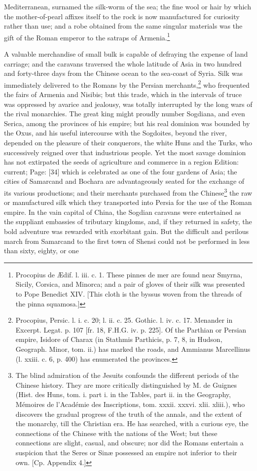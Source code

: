 Mediterranean, surnamed the silk-worm of the sea; the fine wool or hair by which the mother-of-pearl affixes itself to the rock is now manufactured for curiosity rather than use; and a robe obtained from the same singular materials was the gift of the Roman emperor to the satraps of Armenia.\footnote{Procopius de Ædif. l. iii. c. 1. These pinnes de mer are found near Smyrna, Sicily, Corsica, and Minorca; and a pair of gloves of their silk was presented to Pope Benedict XIV. [This cloth is the byssus woven from the threads of the pinna squamosa.]}

A valuable merchandise of small bulk is capable of defraying the expense of land carriage; and the caravans traversed the whole latitude of Asia in two hundred and forty-three days from the Chinese ocean to the sea-coast of Syria. Silk was immediately delivered to the Romans by the Persian merchants,\footnote{Procopius, Persic. l. i. c. 20; l. ii. c. 25. Gothic. l. iv. c. 17. Menander in Excerpt. Legat. p. 107 [fr. 18, F.H.G. iv. p. 225]. Of the Parthian or Persian empire, Isidore of Charax (in Stathmis Parthicis, p. 7, 8, in Hudson, Geograph. Minor, tom. ii.) has marked the roads, and Ammianus Marcellinus (l. xxiii. c. 6, p. 400) has enumerated the provinces.} who frequented the fairs of Armenia and Nisibis; but this trade, which in the intervals of truce was oppressed by avarice and jealousy, was totally interrupted by the long wars of the rival monarchies. The great king might proudly number Sogdiana, and even Serica, among the provinces of his empire; but his real dominion was bounded by the Oxus, and his useful intercourse with the Sogdoites, beyond the river, depended on the pleasure of their conquerors, the white Huns and the Turks, who successively reigned over that industrious people. Yet the most savage dominion has not extirpated the seeds of agriculture and commerce in a region Edition: current; Page: [34] which is celebrated as one of the four gardens of Asia; the cities of Samarcand and Bochara are advantageously seated for the exchange of its various productions; and their merchants purchased from the Chinese\footnote{The blind admiration of the Jesuits confounds the different periods of the Chinese history. They are more critically distinguished by M. de Guignes (Hist. des Huns, tom. i. part i. in the Tables, part ii. in the Geography, Mémoires de l\texthebrew{}’Académie des Inscriptions, tom. xxxii. xxxvi. xlii. xliii.), who discovers the gradual progress of the truth of the annals, and the extent of the monarchy, till the Christian era. He has searched, with a curious eye, the connections of the Chinese with the nations of the West; but these connections are slight, casual, and obscure; nor did the Romans entertain a suspicion that the Seres or Sinæ possessed an empire not inferior to their own. [Cp. Appendix 4.]} the raw or manufactured silk which they transported into Persia for the use of the Roman empire. In the vain capital of China, the Sogdian caravans were entertained as the suppliant embassies of tributary kingdoms, and, if they returned in safety, the bold adventure was rewarded with exorbitant gain. But the difficult and perilous march from Samarcand to the first town of Shensi could not be performed in less than sixty, eighty, or one 